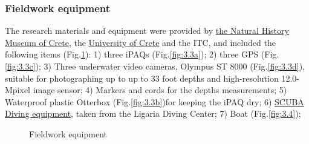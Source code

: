 \documentclass[10pt, a4paper]{article}
\begin{document}
\subsubsection{Fieldwork equipment}
The research materials and equipment were provided by \href{http://www.nhmc.uoc.gr/index-2.htm}{the Natural History Museum of Crete}, the \href{http://www.uoc.gr/Department/index.html}{University of Crete} and the ITC, and included the following items (Fig.\ref{fig:3.3}): 1) three iPAQs (Fig.\ref{fig:3.3a}); 2)
three GPS (Fig.\ref{fig:3.3c}); 3) Three underwater video cameras, Olympus ST 8000  (Fig.\ref{fig:3.3d}), suitable for
photographing up to up to 33 foot depths and high-resolution 12.0-Mpixel image sensor; 4)
Markers and cords for the depths measurements; 5) Waterproof plastic Otterbox  (Fig.\ref{fig:3.3b})for keeping the
iPAQ dry; 6) \href{http://www.padi.com/scuba/}{SCUBA Diving equipment}, taken from the Ligaria Diving Center; 7) Boat (Fig.\ref{fig:3.4}); 

\begin{figure}[h]
	\centering
	\caption{Fieldwork equipment}
	\label{fig:3.3}
\end{figure}
\end{document}
